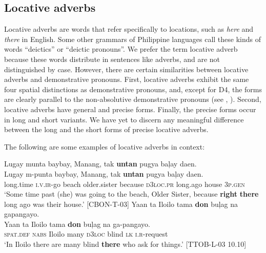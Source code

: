 \subsection{Locative adverbs}
\label{bkm:Ref52477189}

Locative adverbs are words that refer specifically to locations, such as \textit{here} and \textit{there} in English. Some other grammars of Philippine languages call these kinds of words “deictics” or “deictic pronouns”. We prefer the term locative adverb because these words distribute in sentences like adverbs, and are not distinguished by case. However, there are certain similarities between locative adverbs and demonstrative pronouns. First, locative adverbs exhibit the same four spatial distinctions as demonstrative pronouns, and, except for D4, the forms are clearly parallel to the non-absolutive demonstrative pronouns (see , ). Second, locative adverbs have general and precise forms. Finally, the precise forms occur in long and short variants. We have yet to discern any meaningful difference between the long and the short forms of precise locative adverbs.

\begin{table}
\caption{Locative adverbs}
\label{tab:locativeadverbs}
\end{table}

The following are some examples of locative adverbs in context:

\ea
Lugay  munta  baybay,  Manang,  tak  \textbf{untan}  pugya   baļay  daen. \\\smallskip
 \gll Lugay  m-punta  baybay,  Manang,  tak  \textbf{untan}  pugya   baļay  daen. \\
long.time  \textsc{i.v.ir}-go  beach  older.sister  because  \textsc{d3loc.pr}  long.ago
house  3\textsc{p.gen} \\
\glt ‘Some time past (she) was going to the beach, Older Sister, because \textbf{right} \textbf{there} long ago was their house.’ [CBON-T-03]
\z
\ea
Yaan  ta  Iloilo  tama  \textbf{don}  buļag  na  gapangayo. \\\smallskip
 \gll Yaan  ta  Iloilo  tama  \textbf{don}  buļag  na  ga-pangayo. \\
\textsc{spat.def}  \textsc{nabs}  Iloilo  many  \textsc{d3loc}  blind  \textsc{lk}  \textsc{i.r}-request \\
\glt ‘In Iloilo there are many blind \textbf{there} who ask for things.’ [TTOB-L-03 10.10]
\z

